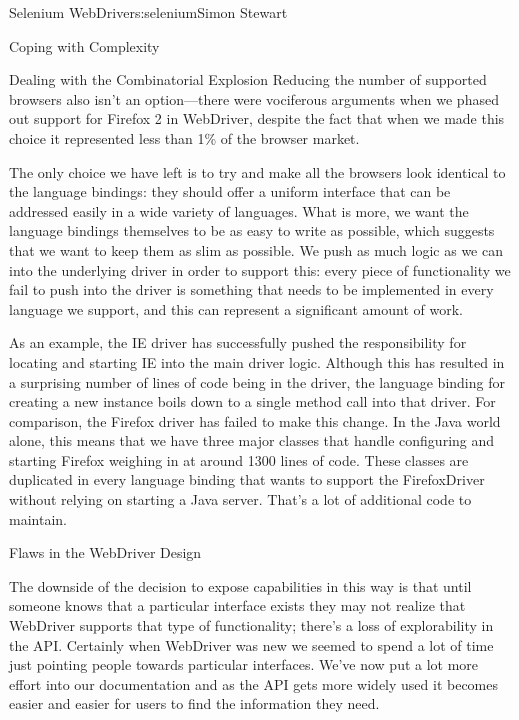 \begin{aosachapter}{Selenium WebDriver}{s:selenium}{Simon Stewart}
\begin{aosasect1}{Coping with Complexity}
\begin{aosasect2}{Dealing with the Combinatorial Explosion}
Reducing the number of supported browsers also isn't an option---there
were vociferous arguments when we phased out support for Firefox 2 in
WebDriver, despite the fact that when we made this choice it
represented less than 1\% of the browser market.

The only choice we have left is to try and make all the browsers look
identical to the language bindings: they should offer a uniform
interface that can be addressed easily in a wide variety of languages.
What is more, we want the language bindings themselves to be as easy
to write as possible, which suggests that we want to keep them as slim
as possible. We push as much logic as we can into the underlying
driver in order to support this: every piece of functionality we fail
to push into the driver is something that needs to be implemented in
every language we support, and this can represent a significant amount
of work.

As an example, the IE driver has successfully pushed the
responsibility for locating and starting IE into the main driver
logic. Although this has resulted in a surprising number of lines of
code being in the driver, the language binding for creating a new
instance boils down to a single method call into that driver. For
comparison, the Firefox driver has failed to make this change. In the
Java world alone, this means that we have three major classes that
handle configuring and starting Firefox weighing in at around 1300
lines of code. These classes are duplicated in every language binding
that wants to support the FirefoxDriver without relying on starting a
Java server. That's a lot of additional code to maintain.

\end{aosasect2}

\begin{aosasect2}{Flaws in the WebDriver Design}

The downside of the decision to expose capabilities in this way is
that until someone knows that a particular interface exists they may
not realize that WebDriver supports that type of functionality;
there's a loss of explorability in the API\@. Certainly when WebDriver
was new we seemed to spend a lot of time just pointing people towards
particular interfaces. We've now put a lot more effort into our
documentation and as the API gets more widely used it becomes easier
and easier for users to find the information they need.


\end{aosasect2}
\end{aosasect1}
\end{aosachapter}
